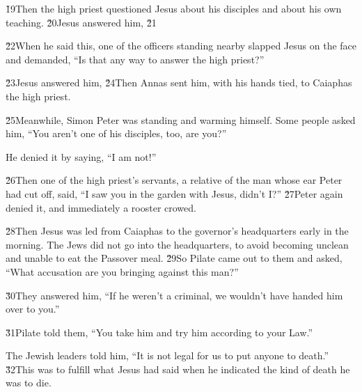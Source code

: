 \v{19}Then the high priest questioned Jesus about his disciples and about his own teaching. \v{20}Jesus answered him,  \v{21}

\v{22}When he said this, one of the officers standing nearby slapped Jesus on the face and demanded, ``Is that any way to answer the high priest?''

\v{23}Jesus answered him,   \v{24}Then Annas sent him, with his hands tied, to Caiaphas the high priest.

\v{25}Meanwhile, Simon Peter was standing and warming himself. Some people asked him, ``You aren't one of his disciples, too, are you?''

He denied it by saying, ``I am not!''

\v{26}Then one of the high priest's servants, a relative of the man whose ear Peter had cut off, said, ``I saw you in the garden with Jesus, didn't I?'' \v{27}Peter again denied it, and immediately a rooster crowed.

\v{28}Then Jesus was led from Caiaphas to the governor's headquarters early in the morning. The Jews did not go into the headquarters, to avoid becoming unclean and unable to eat the Passover meal. \v{29}So Pilate came out to them and asked, ``What accusation are you bringing against this man?''

\v{30}They answered him, ``If he weren't a criminal, we wouldn't have handed him over to you.''

\v{31}Pilate told them, ``You take him and try him according to your Law.''

The Jewish leaders told him, ``It is not legal for us to put anyone to death.'' \v{32}This was to fulfill what Jesus had said when he indicated the kind of death he was to die.


